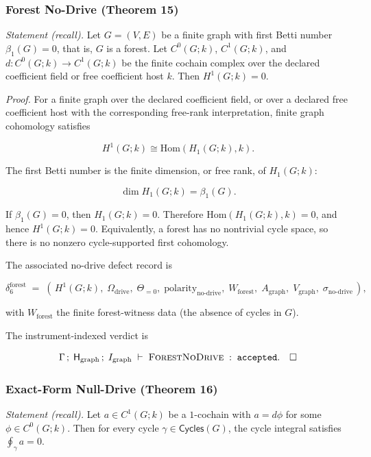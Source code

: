 \documentclass[11pt]{article}
\theoremstyle{definition}
\begin{document}
\subsubsection{Forest No-Drive (Theorem 15)}

\emph{Statement (recall).} Let \(G=(V,E)\) be a finite graph with first Betti number \(\beta_{1}(G)=0\), that is, \(G\) is a forest. Let \(C^{0}(G;k)\), \(C^{1}(G;k)\), and \(d:C^{0}(G;k)\to C^{1}(G;k)\) be the finite cochain complex over the declared coefficient field or free coefficient host \(k\). Then \(H^{1}(G;k)=0\).

\emph{Proof.} For a finite graph over the declared coefficient field, or over a declared free coefficient host with the corresponding free-rank interpretation, finite graph cohomology satisfies

\[
H^{1}(G;k)\cong\mathrm{Hom}(H_{1}(G;k),k).
\]

The first Betti number is the finite dimension, or free rank, of \(H_1(G;k)\):

\[
\dim H_1(G;k)=\beta_1(G).
\]

If \(\beta_1(G)=0\), then \(H_1(G;k)=0\). Therefore \(\mathrm{Hom}(H_1(G;k),k)=0\), and hence \(H^1(G;k)=0\). Equivalently, a forest has no nontrivial cycle space, so there is no nonzero cycle-supported first cohomology.

The associated no-drive defect record is

\[
\delta_{6}^{\mathrm{forest}}\;=\;(\,H^{1}(G;k),\;\Omega_{\mathrm{drive}},\;\Theta_{=0},\;\mathrm{polarity}_{\mathrm{no\text{-}drive}},\;W_{\mathrm{forest}},\;A_{\mathrm{graph}},\;V_{\mathrm{graph}},\;\sigma_{\mathrm{no\text{-}drive}}\,),
\]

with \(W_{\mathrm{forest}}\) the finite forest-witness data (the absence of cycles in \(G\)).

The instrument-indexed verdict is

\[
\Gamma\,;\;\mathsf H_{\mathrm{graph}}\,;\;I_{\mathrm{graph}}\;\vdash\;\textsc{ForestNoDrive}\;:\;\texttt{accepted}.\quad\square
\]

\subsubsection{Exact-Form Null-Drive (Theorem 16)}

\emph{Statement (recall).} Let \(a\in C^{1}(G;k)\) be a \(1\)-cochain with \(a=d\phi\) for some \(\phi\in C^{0}(G;k)\). Then for every cycle \(\gamma\in\mathsf{Cycles}(G)\), the cycle integral satisfies \(\oint_{\gamma}a=0\).
\end{document}
